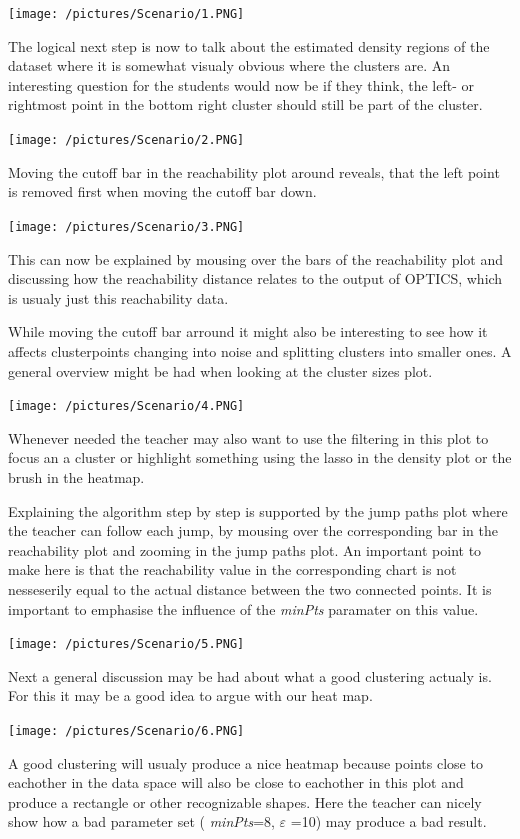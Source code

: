 \documentclass{vgtc}                          %
\begin{document}
\texttt{[image: /pictures/Scenario/1.PNG]}

The logical next step is now to talk about the estimated density regions of the dataset where it is somewhat visualy obvious where the clusters are. An interesting question for the students would now be if they think, the left- or rightmost point in the bottom right cluster should still be part of the cluster.

\texttt{[image: /pictures/Scenario/2.PNG]}

Moving the cutoff bar in the reachability plot around reveals, that the left point is removed first when moving the cutoff bar down.

\texttt{[image: /pictures/Scenario/3.PNG]}

This can now be explained by mousing over the bars of the reachability plot and discussing how the reachability distance relates to the output of OPTICS, which is usualy just this reachability data.

While moving the cutoff bar arround it might also be interesting to see how it affects clusterpoints changing into noise and splitting clusters into smaller ones. A general overview might be had when looking at the cluster sizes plot.

\texttt{[image: /pictures/Scenario/4.PNG]}

Whenever needed the teacher may also want to use the filtering in this plot to focus an a cluster or highlight something using the lasso in the density plot or the brush in the heatmap.

Explaining the algorithm step by step is supported by the jump paths plot where the teacher can follow each jump, by mousing over the corresponding bar in the reachability plot and zooming in the jump paths plot. An important point to make here is that the reachability value in the corresponding chart is not nesseserily equal to the actual distance between the two connected points. It is important to emphasise the influence of the  \emph{minPts} paramater on this value.

\texttt{[image: /pictures/Scenario/5.PNG]}

Next a general discussion may be had about what a good clustering actualy is. For this it may be a good idea to argue with our heat map.

\texttt{[image: /pictures/Scenario/6.PNG]}

A good clustering will usualy produce a nice heatmap because points close to eachother in the data space will also be close to eachother in this plot and produce a rectangle or other recognizable shapes. Here the teacher can nicely show how a bad parameter set ( \emph{minPts}=8,  $\varepsilon$ =10) may produce a bad result.
\end{document}
